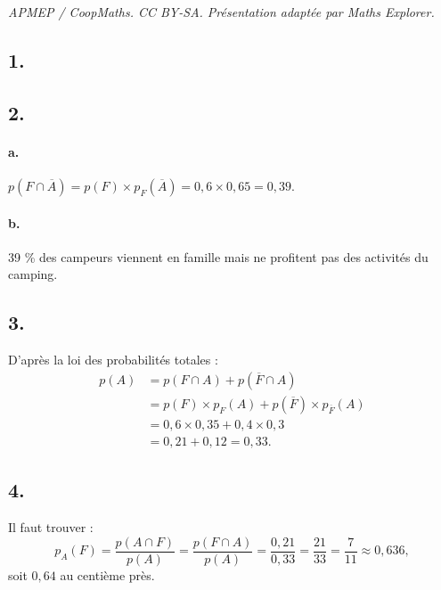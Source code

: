 \documentclass[10pt]{article}
\begin{document}
\noindent\textit{APMEP / CoopMaths. CC BY-SA. Présentation adaptée par Maths Explorer.}\par\medskip
\subsection*{1.}

\begin{center}
\end{center}

\subsection*{2.}

\paragraph{a.} \(p(F \cap \overline{A}) = p(F) \times p_F(\overline{A}) = 0{,}6 \times 0{,}65 = 0{,}39\).

\paragraph{b.} 39 \% des campeurs viennent en famille mais ne profitent pas des activités du camping.

\subsection*{3.}

D'après la loi des probabilités totales :
\begin{align*}
p(A) &= p(F \cap A) + p(\overline{F} \cap A) \\
&= p(F) \times p_F(A) + p(\overline{F}) \times p_{\overline{F}}(A) \\
&= 0{,}6 \times 0{,}35 + 0{,}4 \times 0{,}3 \\
&= 0{,}21 + 0{,}12 = 0{,}33.
\end{align*}

\subsection*{4.}

Il faut trouver :
\[
p_{A}(F) = \dfrac{p(A \cap F)}{p(A)} = \dfrac{p(F \cap A)}{p(A)} = \dfrac{0{,}21}{0{,}33} = \dfrac{21}{33} = \dfrac{7}{11} \approx 0{,}636,
\]
soit \(0{,}64\) au centième près.
\end{document}
